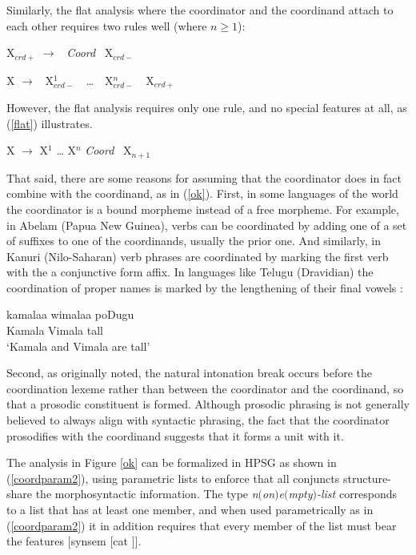 \documentclass[output=paper]{langsci/langscibook}
\begin{document}
\noindent
Similarly, the flat analysis where the coordinator and the coordinand attach to each other  requires two  rules well
(where $n \geq 1$):

\begin{exe}
\ex
\begin{xlista}
\ex X$_{crd+}$ $\rightarrow$ \, \emph{Coord} \, X$_{crd-}$
 
\ex X $\rightarrow$ \, X$^1_{crd-}$  \,\, \ldots{} \,\, X$^n_{crd-}$ \,\, X$_{crd+}$
\end{xlista}
\end{exe}\label{ok}

\noindent
However, the flat analysis requires only one rule, and no
special features at all, as (\ref{flat}) illustrates. 

\begin{exe}
\ex X  $\rightarrow$ X$^1$ \ldots{} X$^n$ \emph{Coord} \, X$_{n+1}$
\end{exe}\label{flat}

That said, there are some reasons for assuming that the coordinator does in fact combine with the coordinand, as in (\ref{ok}). First, in some  languages of the world the coordinator is a bound morpheme instead of a free morpheme.
For example, in Abelam (Papua New Guinea),  verbs can be coordinated by adding one of a set of suffixes to one of the coordinands, usually the prior one. And similarly, in Kanuri (Nilo-Saharan) verb phrases are coordinated by marking the first verb with the a conjunctive form affix. In languages like Telugu (Dravidian) the coordination of proper names is marked  by the lengthening of their final vowels \citep{Bender05}:

\begin{exe}
\ex \gll kamalaa wimalaa poDugu \\ 
 Kamala Vimala tall\\
\glt `Kamala and Vimala are tall'
\end{exe}



Second, as
\citet{Ross67a} originally noted, the natural intonation break occurs before the coordination lexeme rather than between the coordinator and the coordinand, so that a  prosodic constituent is formed.
Although prosodic phrasing is not generally believed to always align with syntactic phrasing, the fact that the coordinator prosodifies with the  coordinand suggests that it forms a unit with it.

 The analysis in Figure \ref{ok} can be formalized in HPSG as
 shown in  (\ref{coordparam2}),  using parametric lists  \citep{pollardsag} to enforce
 that all conjuncts structure-share the morphosyntactic information. The type \textit{n$($on$)$e$($mpty$)$-list} corresponds
 to a list that has at least one member, and when used parametrically as in (\ref{coordparam2}) it in addition requires that
 every member of the list must bear the features $[${\sc synsem} $[${\sc cat}  $]]$.
\end{document}
